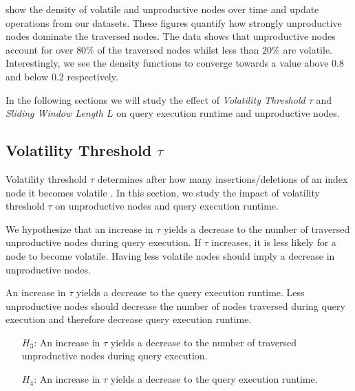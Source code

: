 \documentclass[abstracton,12pt]{scrartcl}
\theoremstyle{definition}
\begin{document}
show the density of volatile and unproductive nodes over time and update
operations from our datasets. These figures quantify how strongly unproductive
nodes dominate the traversed nodes. The data shows that unproductive nodes
account for over $80\%$ of the traversed nodes whilst less than $20\%$ are volatile. 
Interestingly, we see the density functions to converge towards a value above
$0.8$ and below $0.2$ respectively.

In the following sections we will study the effect of \textit{Volatility
  Threshold $\tau$} and \textit{Sliding Window Length $L$} on query execution runtime and
unproductive nodes.

\subsection{Volatility Threshold $\tau$}

Volatility threshold $\tau$ determines after how many insertions/deletions of an index node
it becomes volatile \cite{KW17}. In this section, we study the impact of
volatility threshold $\tau$ on unproductive nodes and query execution runtime.

We hypothesize that an increase in $\tau$ yields a decrease to the number of traversed unproductive
nodes during query execution. If $\tau$ increases, it is less likely for a node to become
volatile. Having less volatile nodes should imply a decrease in unproductive nodes.

An increase in $\tau$ yields a decrease to the query execution runtime. Less
unproductive nodes should decrease the number of nodes traversed
during query execution and therefore decrease query execution runtime.

\begin{shaded}
  \begin{itemize}
  \item[$H_3$:] An increase in $\tau$ yields a decrease to the number of
    traversed unproductive nodes during query execution.
  \item[$H_4$:] An increase in $\tau$ yields a decrease to the query execution runtime. 
    \end{itemize}
\end{shaded}
\end{document}
